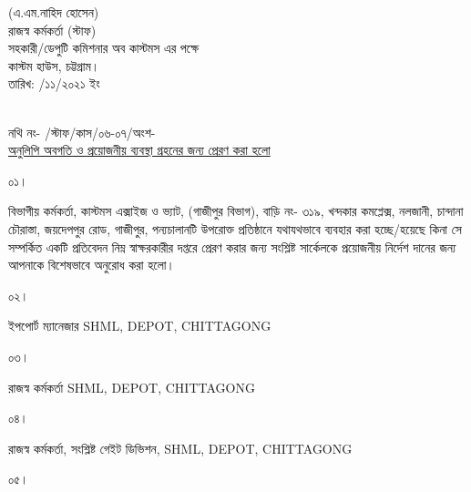 \documentclass[12pt]{article}
\newcommand{\fileno}{নথি নং- \hspace{5em}/স্টাফ/কাস/০৬-০৭/অংশ-  }
\newcommand{\depo}{SHML, DEPOT, CHITTAGONG}
\newcommand{\rodt}{\hspace*{3.0em} তারিখ: \hspace{3.5em}/১১/২০২১ ইং}
\begin{document}
\begin{minipage}[t]{0.28\linewidth}
\hspace*{3.4em}\footnotesize{(এ.এম.নাহিদ হোসেন)}
\\
\hspace*{3.4em}\footnotesize{রাজস্ব কর্মকর্তা (স্টাফ)}
\\
\scriptsize{সহকারী/ডেপুটি কমিশনার অব কাস্টমস এর পক্ষে}
\\
\hspace*{5.5em}\scriptsize{কাস্টম হাউস, চট্টগ্রাম।}
\\
\scriptsize{{\rodt}}
\end{minipage}
\\
\scriptsize{{\fileno}}
\\
\underline{\scriptsize{অনুলিপি অবগতি ও প্রয়োজনীয় ব্যবস্থা গ্রহনের জন্য প্রেরণ করা হলো}}
\\
\begin{minipage}[t]{0.06\linewidth}
\scriptsize{০১।}
\end{minipage}
\begin{minipage}[t]{0.94\linewidth}
\scriptsize{বিভাগীয় কর্মকর্তা, কাস্টমস এক্সাইজ ও ভ্যাট, (গাজীপুর বিভাগ),
বাড়ি নং- ৩১৯,
খন্দকার কমপ্লেক্স, নলজানী,
চান্দানা চৌরাস্তা, জয়দেপপুর রোড,
গাজীপুর,
পন্যচালানটি উপরোক্ত প্রতিষ্ঠানে যথাযথভাবে
ব্যবহার করা হচ্ছে/হয়েছে কিনা সে
সম্পর্কিত একটি প্রতিবেদন নিম্ন স্বাক্ষরকারীর
দপ্তরে প্রেরণ করার জন্য সংশ্লিষ্ট সার্কেলকে
প্রয়োজনীয় নির্দেশ দানের জন্য আপনাকে
বিশেষভাবে অনুরোধ করা হলো।}
\end{minipage}
\begin{minipage}[t]{0.06\linewidth}
\scriptsize{০২।}
\end{minipage}
\begin{minipage}[t]{0.94\linewidth}
\scriptsize{ইপপোর্ট ম্যানেজার {\depo}}
\end{minipage}
\begin{minipage}[t]{0.06\linewidth}
\scriptsize{০৩।}
\end{minipage}
\begin{minipage}[t]{0.94\linewidth}
\scriptsize{রাজস্ব কর্মকর্তা {\depo}}
\end{minipage}
\begin{minipage}[t]{0.06\linewidth}
\scriptsize{০৪।}
\end{minipage}
\begin{minipage}[t]{0.94\linewidth}
\scriptsize{রাজস্ব কর্মকর্তা, সংশ্লিষ্ট গেইট ডিভিশন, {\depo}}
\end{minipage}
\begin{minipage}[t]{0.06\linewidth}
\scriptsize{০৫।}
\end{minipage}
\end{document}
